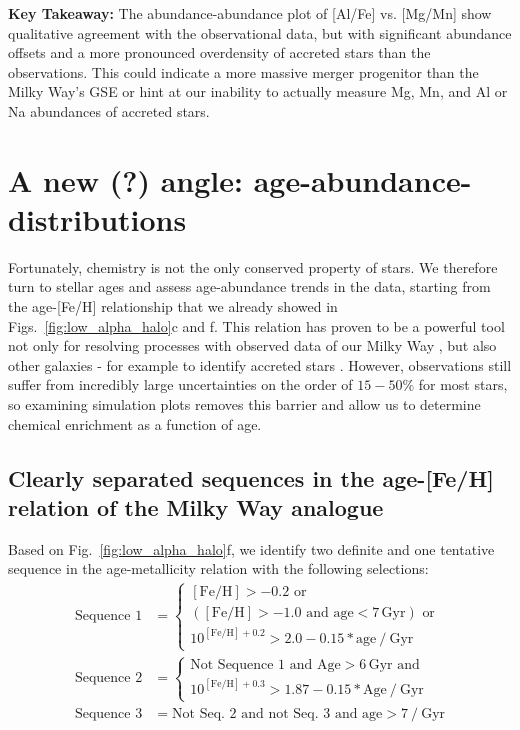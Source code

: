 \documentclass[fleqn,usenatbib]{mnras}
\begin{document}
\textbf{Key Takeaway:} The abundance-abundance plot of [Al/Fe] vs. [Mg/Mn] show qualitative agreement with the observational data, but with significant abundance offsets and a more pronounced overdensity of accreted stars than the observations. This could indicate a more massive merger progenitor than the Milky Way's GSE or hint at our inability to actually measure Mg, Mn, and Al or Na abundances of accreted stars.

\section{A new (?) angle: age-abundance-distributions}\label{sec:Age-abundance}

Fortunately, chemistry is not the only conserved property of stars. We therefore turn to stellar ages and assess age-abundance trends in the data, starting from the age-[Fe/H] relationship that we already showed in Figs.~\ref{fig:low_alpha_halo}c and f. This relation has proven to be a powerful tool not only for resolving processes with observed data of our Milky Way \citep[e.g.][]{Twarog1980, Edvardsson1993, Nordstroem2004, Casagrande2011, Feuillet2019, Xiang2022}, but also other galaxies - for example to identify accreted stars \citep[e.g.][]{Pinna2019b, Martig2021}. However, observations still suffer from incredibly large uncertainties on the order of $15-50\%$ for most stars, so examining simulation plots removes this barrier and allow us to determine chemical enrichment as a function of age.

\subsection{Clearly separated sequences in the age-[Fe/H] relation of the Milky Way analogue} \label{sec:sequences}

Based on Fig.~\ref{fig:low_alpha_halo}f, we identify two definite and one tentative sequence in the age-metallicity relation with the following selections:
\begin{align}
    \text{Sequence~1} &= \begin{cases}
        \mathrm{[Fe/H] > -0.2} \text{ or} \\
        (\mathrm{[Fe/H]} > -1.0 \text{ and } \mathrm{age} < 7\,\mathrm{Gyr}) \text{ or} \\
        10^{\mathrm{[Fe/H]} + 0.2} > 2.0 - 0.15*\mathrm{age}~/~\mathrm{Gyr}
    \end{cases} \label{eq:sequence1} \\
    \text{Sequence~2} &= \begin{cases}
        \text{Not Sequence~1 and }\mathrm{Age} > 6\,\mathrm{Gyr} \text{ and} \\
        10^{\mathrm{[Fe/H]} + 0.3} > 1.87 - 0.15*\mathrm{Age}~/~\mathrm{Gyr}
    \end{cases}  \label{eq:sequence2} \\
    \text{Sequence~3} &= \text{Not Seq.~2 and not Seq.~3 and } \mathrm{age} > 7~/~\mathrm{Gyr}  \label{eq:sequence3}
\end{align}
\end{document}

